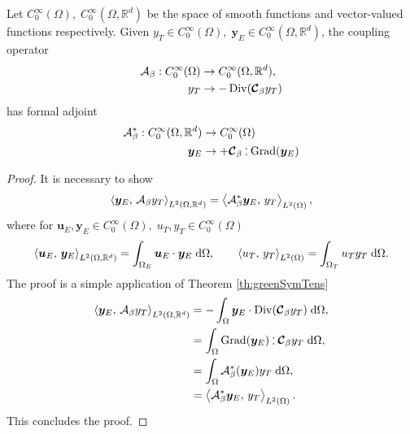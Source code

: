 \begin{proposition}
Let $C_0^{\infty}(\Omega), \; C_0^{\infty}(\Omega, \mathbb{R}^d)$ be the space of smooth functions and vector-valued functions respectively. Given $y_T \in C_0^{\infty}(\Omega), \; \bm{y}_E \in C_0^{\infty}(\Omega, \mathbb{R}^d)$, the coupling operator 
\begin{equation}
\begin{aligned}
\mathcal{A}_\beta  : C_0^{\infty}(\Omega) &\rightarrow C_0^{\infty}(\Omega, \mathbb{R}^d), \\
y_T &\rightarrow - \Div(\bm{\mathcal{C}}_\beta y_T)
\end{aligned}
\end{equation}
has formal adjoint 
\begin{equation}
\begin{aligned}
\mathcal{A}_\beta^* : C_0^{\infty}(\Omega, \mathbb{R}^d) &\rightarrow C_0^{\infty}(\Omega) \\
\bm{y}_E &\rightarrow +\bm{\mathcal{C}}_\beta \cddot  \Grad(\bm{y}_E)
\end{aligned}
\end{equation}
\begin{proof}
It is necessary to show
\begin{equation}
	\inner[L^2(\Omega, \mathbb{R}^d)]{\bm{y}_E}{\mathcal{A}_\beta y_T} = \inner[L^2(\Omega)]{\mathcal{A}_\beta^*\bm{y}_E}{y_T}, 
\end{equation}
where for $\bm{u}_E, \bm{y}_E \in C_0^{\infty}(\Omega), \; u_T, y_T \in C_0^{\infty}(\Omega)$
\begin{equation}
\inner[L^2(\Omega, \mathbb{R}^d)]{\bm{u}_E}{\bm{y}_E} = \int_{\Omega_E} \bm{u}_E \cdot \bm{y}_E \d{\Omega}, \qquad \inner[L^2(\Omega)]{u_T}{y_T} = \int_{\Omega_T} u_T y_T \d{\Omega}.
\end{equation}
The proof is a simple application of Theorem \ref{th:greenSymTens}
\begin{equation}
\begin{aligned}
\inner[L^2(\Omega, \mathbb{R}^d)]{\bm{y}_E}{\mathcal{A}_\beta y_T} &= -\int_{\Omega} \bm{y}_E \cdot \Div(\bm{\mathcal{C}}_\beta y_T) \d{\Omega}, \\
&= \int_{\Omega} \Grad(\bm{y}_E) \cddot \bm{\mathcal{C}}_\beta y_T \d{\Omega}, \\
&= \int_{\Omega} \mathcal{A}_\beta^*(\bm{y}_E) y_T \d{\Omega}, \\
&= \inner[L^2(\Omega)]{\mathcal{A}_\beta^*\bm{y}_E}{y_T}.
\end{aligned}
\end{equation}
This concludes the proof.
\end{proof}
\end{proposition}
